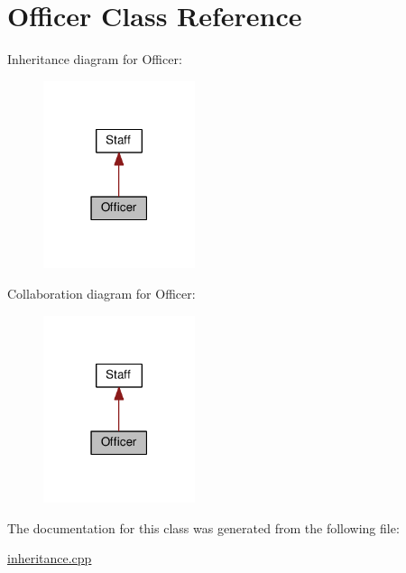 \hypertarget{class_officer}{}\section{Officer Class Reference}
\label{class_officer}


Inheritance diagram for Officer\+:
\nopagebreak
\begin{figure}[H]
\begin{center}
\leavevmode
\includegraphics[width=126pt]{class_officer__inherit__graph}
\end{center}
\end{figure}


Collaboration diagram for Officer\+:
\nopagebreak
\begin{figure}[H]
\begin{center}
\leavevmode
\includegraphics[width=126pt]{class_officer__coll__graph}
\end{center}
\end{figure}


The documentation for this class was generated from the following file\+:\begin{DoxyCompactItemize}
\item 
\hyperlink{inheritance_8cpp}{inheritance.\+cpp}\end{DoxyCompactItemize}
